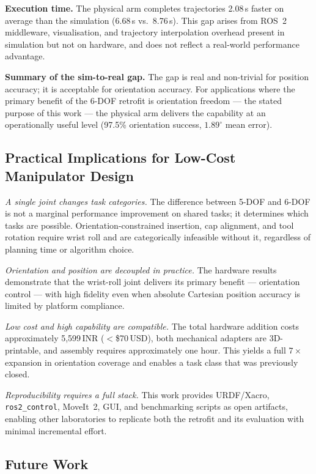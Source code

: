 \documentclass[conference]{IEEEtran}
\begin{document}
	\textbf{Execution time.}
	The physical arm completes trajectories 2.08\,s faster on average than
	the simulation (6.68\,s vs.\ 8.76\,s). This gap arises from ROS~2
	middleware, visualisation, and trajectory interpolation overhead
	present in simulation but not on hardware, and does not reflect a
	real-world performance advantage.
	
	\textbf{Summary of the sim-to-real gap.}
	The gap is real and non-trivial for position accuracy; it is
	acceptable for orientation accuracy. For applications where the primary
	benefit of the 6-DOF retrofit is orientation freedom --- the stated
	purpose of this work --- the physical arm delivers the capability at an
	operationally useful level (97.5\% orientation success, $1.89^\circ$
	mean error).
	
	\subsection{Practical Implications for Low-Cost Manipulator Design}
	
	\textit{A single joint changes task categories.}
	The difference between 5-DOF and 6-DOF is not a marginal performance
	improvement on shared tasks; it determines which tasks are possible.
	Orientation-constrained insertion, cap alignment, and tool rotation
	require wrist roll and are categorically infeasible without it,
	regardless of planning time or algorithm choice.
	
	\textit{Orientation and position are decoupled in practice.}
	The hardware results demonstrate that the wrist-roll joint delivers its
	primary benefit --- orientation control --- with high fidelity even
	when absolute Cartesian position accuracy is limited by platform
	compliance.
	
	\textit{Low cost and high capability are compatible.}
	The total hardware addition costs approximately 5,599\,INR
	($<$\$70\,USD), both mechanical adapters are 3D-printable, and
	assembly requires approximately one hour. This yields a full $7\times$
	expansion in orientation coverage and enables a task class that was
	previously closed.
	
	\textit{Reproducibility requires a full stack.}
	This work provides URDF/Xacro, \texttt{ros2\_control}, MoveIt~2, GUI,
	and benchmarking scripts as open artifacts, enabling other laboratories
	to replicate both the retrofit and its evaluation with minimal
	incremental effort.
	
	\subsection{Future Work}
	
\end{document}
